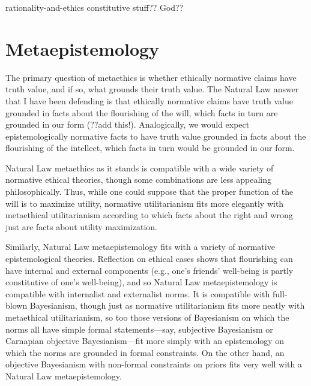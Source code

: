 rationality-and-ethics constitutive stuff?? God??

\section{Metaepistemology}
The primary question of metaethics is whether ethically normative claims have truth value, and if so, what grounds their truth value.
The Natural Law answer that I have been defending is that ethically normative claims have truth value grounded in facts about the 
flourishing of the will, which facts in turn are grounded in our form (??add this!). Analogically, we would expect epistemologically 
normative facts to have truth value grounded in facts about the flourishing of the intellect, which facts in turn would be grounded
in our form.

Natural Law metaethics as it stands is compatible with a wide variety of normative ethical theories, though some combinations are
less appealing philosophically. Thus, while one could suppose that the proper function of the will is to maximize utility, 
normative utilitarianism fits more elegantly with metaethical utilitarianism according to which facts about the right
and wrong just are facts about utility maximization. 

Similarly, Natural Law metaepistemology fits with a variety of normative epistemological theories. Reflection on ethical cases
shows that flourishing can have internal and external components (e.g., one's friends' well-being is partly constitutive of one's 
well-being), and so Natural Law metaepistemology is compatible with internalist and externalist norms. It is compatible with 
full-blown Bayesianism, though just as normative utilitarianism fits more neatly with metaethical utilitarianism, so too those
versions of Bayesianism on which the norms all have simple formal statements---say, subjective Bayesianism or Carnapian objective
Bayesianism---fit more simply with an epistemology on which the norms are grounded in formal constraints. On the other hand, an
objective Bayesianism with non-formal constraints on priors fits very well with a Natural Law metaepistemology.

